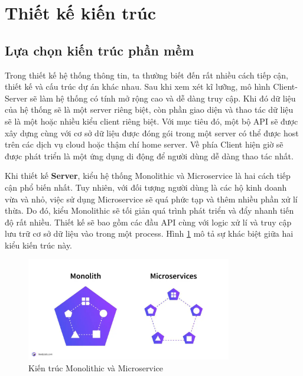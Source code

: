 \documentclass[../DoAn.tex]{subfiles}
\begin{document}
\section{Thiết kế kiến trúc}
\label{section:systemdesign}

\subsection{Lựa chọn kiến trúc phần mềm}
\label{subsection:systemdesign-architecture}
Trong thiết kế hệ thống thông tin, ta thường biết đến rất nhiều cách tiếp cận, thiết kế và cấu trúc dự án khác nhau. Sau khi xem xét kĩ lưỡng, mô hình Client-Server sẽ làm hệ thống có tính mở rộng cao và dễ dàng truy cập. Khi đó dữ liệu của hệ thống sẽ là một server riêng biệt, còn phần giao diện và thao tác dữ liệu sẽ là một hoặc nhiều kiểu client riêng biệt. Với mục tiêu đó, một bộ API sẽ được xây dựng cùng với cơ sở dữ liệu được đóng gói trong một server có thể được host trên các dịch vụ cloud hoặc thậm chí home server. Về phía Client hiện giờ sẽ được phát triển là một ứng dụng di động để người dùng dễ dàng thao tác nhất.

Khi thiết kế \textbf{Server}, kiểu hệ thống Monolithic và Microservice là hai cách tiếp cận phổ biến nhất. Tuy nhiên, với đối tượng người dùng là các hộ kinh doanh vừa và nhỏ, việc sử dụng Microservice sẽ quá phức tạp và thêm nhiều phần xử lí thừa. Do đó, kiểu Monolithic sẽ tối giản quá trình phát triển và đẩy nhanh tiến độ rất nhiều. Thiết kế sẽ bao gồm các đầu API cùng với logic xử lí và truy cập lưu trữ cơ sở dữ liệu vào trong một process. Hình \ref{fig:MonolithVsMicroservices}  mô tả sự khác biệt giữa hai kiểu kiến trúc này.
\begin{figure}[H]
    \centering
    \includegraphics[width=0.8\textwidth]{Hinhve/design/architecture/MonolithVsMicroservices}
    \caption{Kiến trúc Monolithic và Microservice \cite{monovsmicroitoutposts}}
    \label{fig:MonolithVsMicroservices}
\end{figure}
\vfill
\break
\end{document}
